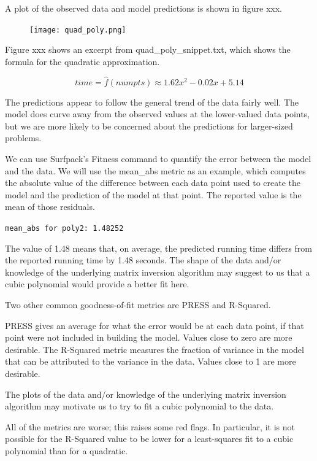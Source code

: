 \documentclass{article}
\begin{document}


A plot of the observed data and model predictions is shown in figure xxx.

\begin{figure}[htbp]
\texttt{[image: quad\_poly.png]}
\end{figure}

Figure xxx shows an excerpt from quad\_poly\_snippet.txt, which shows the formula for the quadratic approximation.



\[ time = \hat{f}(numpts) \approx 1.62x^2 - 0.02x + 5.14 \]

The predictions appear to follow the general trend of the data fairly well.  The model does curve away from the observed values at the lower-valued data points, but we are more likely to be concerned about the predictions for larger-sized problems.

We can use Surfpack's Fitness command to quantify the error between the model and the data.  We will use the mean\_abs metric as an example, which computes the absolute value of the difference between each data point used to create the model and the prediction of the model at that point.  The reported value is the mean of those residuals.

\texttt{mean\_abs for poly2: 1.48252}

The value of 1.48 means that, on average, the predicted running time differs from the reported running time by 1.48 seconds.  The shape of the data and/or knowledge of the underlying matrix inversion algorithm may suggest to us that a cubic polynomial would provide a better fit here.

Two other common goodness-of-fit metrics are PRESS and R-Squared.


PRESS gives an average for what the error would be at each data point, if that point were not included in building the model.  Values close to zero are more desirable.  The R-Squared metric measures the fraction of variance in the model that can be attributed to the variance in the data.  Values close to 1 are more desirable.

The plots of the data and/or knowledge of the underlying matrix inversion algorithm may motivate us to try to fit a cubic polynomial to the data.



All of the metrics are worse; this raises some red flags.  In particular, it is not possible for the R-Squared value to be lower for a least-squares fit to a cubic polynomial than for a quadratic.
\end{document}
